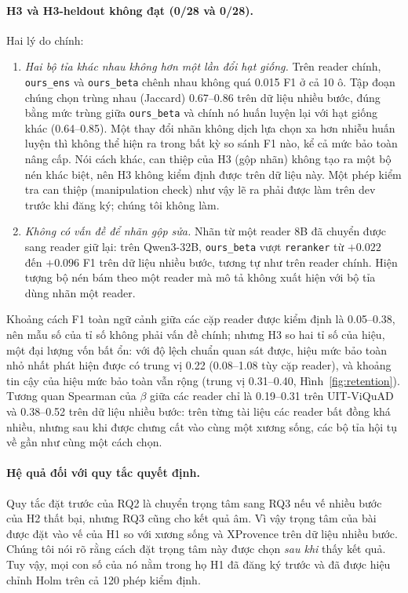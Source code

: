 \documentclass[11pt]{article}
\newcommand{\arm}[1]{\texttt{#1}}
\begin{document}
\paragraph{H3 và H3-heldout không đạt (0/28 và 0/28).} Hai lý do chính:
\begin{enumerate}
  \item \emph{Hai bộ tỉa khác nhau không hơn một lần đổi hạt giống.} Trên reader chính, \arm{ours\_ens} và
  \arm{ours\_beta} chênh nhau không quá 0.015 F1 ở cả 10 ô. Tập đoạn chúng chọn trùng nhau (Jaccard) 0.67--0.86
  trên dữ liệu nhiều bước, đúng bằng mức trùng giữa \arm{ours\_beta} và chính nó huấn luyện lại với hạt giống
  khác (0.64--0.85). Một thay đổi nhãn không dịch lựa chọn xa hơn nhiễu huấn luyện thì không thể hiện ra trong
  bất kỳ so sánh F1 nào, kể cả mức bảo toàn nâng cấp. Nói cách khác, can thiệp của H3 (gộp nhãn) không tạo ra một bộ
  nén khác biệt, nên H3 không kiểm định được trên dữ liệu này. Một phép kiểm tra can thiệp (manipulation check) như
  vậy lẽ ra phải được làm trên dev trước khi đăng ký; chúng tôi không làm.
  \item \emph{Không có vấn đề để nhãn gộp sửa.} Nhãn từ một reader 8B đã chuyển được sang reader giữ lại:
  trên Qwen3-32B, \arm{ours\_beta} vượt \arm{reranker} từ $+0.022$ đến $+0.096$ F1 trên dữ liệu nhiều bước,
  tương tự như trên reader chính. Hiện tượng bộ nén bám theo một reader mà \citet{readerScaling2026} mô tả
  không xuất hiện với bộ tỉa dùng nhãn một reader.
\end{enumerate}
Khoảng cách F1 toàn ngữ cảnh giữa các cặp reader được kiểm định là 0.05--0.38, nên mẫu số của tỉ số không
phải vấn đề chính; nhưng H3 so hai tỉ số của hiệu, một đại lượng vốn bất ổn: với độ lệch chuẩn quan sát được, hiệu mức bảo
toàn nhỏ nhất phát hiện được có trung vị 0.22 (0.08--1.08 tùy cặp reader), và khoảng tin cậy của hiệu mức bảo
toàn vẫn rộng (trung vị 0.31--0.40, Hình~\ref{fig:retention}). Tương quan Spearman của $\beta$ giữa các reader chỉ là 0.19--0.31 trên UIT-ViQuAD và
0.38--0.52 trên dữ liệu nhiều bước: trên từng tài liệu các reader bất đồng khá nhiều, nhưng sau khi được
chưng cất vào cùng một xương sống, các bộ tỉa hội tụ về gần như cùng một cách chọn.

\paragraph{Hệ quả đối với quy tắc quyết định.} Quy tắc đặt trước của RQ2 là chuyển trọng tâm sang RQ3 nếu
vế nhiều bước của H2 thất bại, nhưng RQ3 cũng cho kết quả âm. Vì vậy trọng tâm của bài được đặt vào vế của
H1 so với xương sống và XProvence trên dữ liệu nhiều bước. Chúng tôi nói rõ rằng cách đặt trọng tâm này
được chọn \emph{sau khi} thấy kết quả. Tuy vậy, mọi con số của nó nằm trong họ H1 đã đăng ký trước và đã
được hiệu chỉnh Holm trên cả 120 phép kiểm định.
\end{document}
